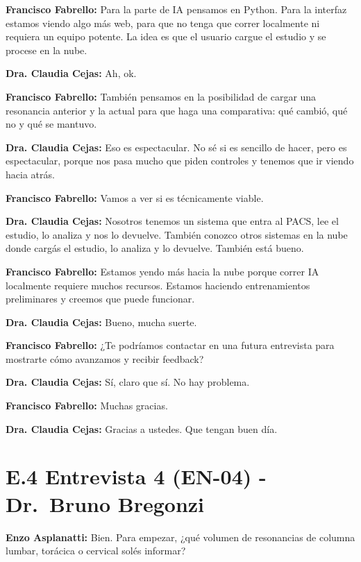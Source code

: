 \noindent\textbf{Francisco Fabrello:} Para la parte de IA pensamos en Python. Para la interfaz estamos viendo algo más web, para que no tenga que correr localmente ni requiera un equipo potente. La idea es que el usuario cargue el estudio y se procese en la nube.

\noindent\textbf{Dra. Claudia Cejas:} Ah, ok.

\noindent\textbf{Francisco Fabrello:} También pensamos en la posibilidad de cargar una resonancia anterior y la actual para que haga una comparativa: qué cambió, qué no y qué se mantuvo.

\noindent\textbf{Dra. Claudia Cejas:} Eso es espectacular. No sé si es sencillo de hacer, pero es espectacular, porque nos pasa mucho que piden controles y tenemos que ir viendo hacia atrás.

\noindent\textbf{Francisco Fabrello:} Vamos a ver si es técnicamente viable.

\noindent\textbf{Dra. Claudia Cejas:} Nosotros tenemos un sistema que entra al PACS, lee el estudio, lo analiza y nos lo devuelve. También conozco otros sistemas en la nube donde cargás el estudio, lo analiza y lo devuelve. También está bueno.

\noindent\textbf{Francisco Fabrello:} Estamos yendo más hacia la nube porque correr IA localmente requiere muchos recursos. Estamos haciendo entrenamientos preliminares y creemos que puede funcionar.

\noindent\textbf{Dra. Claudia Cejas:} Bueno, mucha suerte.

\noindent\textbf{Francisco Fabrello:} ¿Te podríamos contactar en una futura entrevista para mostrarte cómo avanzamos y recibir feedback?

\noindent\textbf{Dra. Claudia Cejas:} Sí, claro que sí. No hay problema.

\noindent\textbf{Francisco Fabrello:} Muchas gracias.

\noindent\textbf{Dra. Claudia Cejas:} Gracias a ustedes. Que tengan buen día.
\section*{E.4 Entrevista 4 (EN-04) - Dr.~Bruno Bregonzi}
\label{anexo:entrevista-en04}

\noindent\textbf{Enzo Asplanatti:} Bien. Para empezar, ¿qué volumen de resonancias de columna lumbar, torácica o cervical solés informar?


